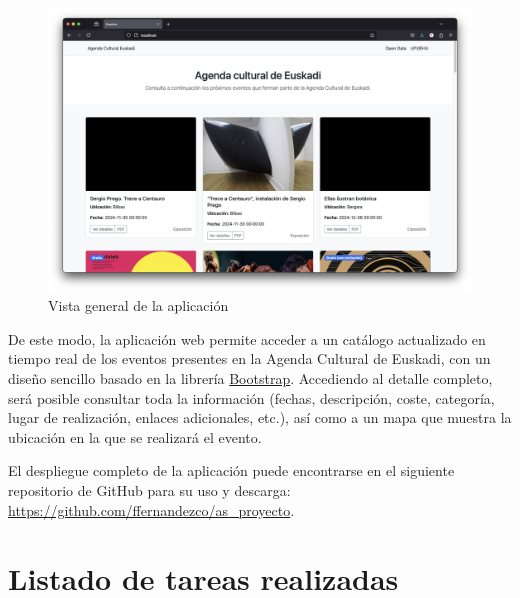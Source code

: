 \documentclass{report}
\begin{document}
        \begin{figure}[H]
            \centering
            \includegraphics[width=0.8\linewidth]{img/general.png}
            \caption{Vista general de la aplicación}
            \label{fig:general}
        \end{figure}

        De este modo, la aplicación web permite acceder a un catálogo actualizado en tiempo real de los eventos presentes en la Agenda Cultural de Euskadi, con un diseño sencillo basado en la librería \href{https://getbootstrap.com}{Bootstrap}. Accediendo al detalle completo, será posible consultar toda la información (fechas, descripción, coste, categoría, lugar de realización, enlaces adicionales, etc.), así como a un mapa que muestra la ubicación en la que se realizará el evento.

        El despliegue completo de la aplicación puede encontrarse en el siguiente repositorio de GitHub para su uso y descarga: \url{https://github.com/ffernandezco/as_proyecto}.

    \chapter{Listado de tareas realizadas}
\end{document}
